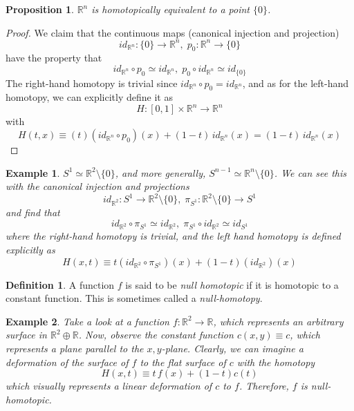\documentclass{article}
\newtheorem{proposition}[theorem]{Proposition}
\newtheorem{example}{Example}[section]
\theoremstyle{remark}
\theoremstyle{definition}
\newtheorem{definition}{Definition}[section]
\begin{document}
    \begin{proposition}
    $\mathbb{R}^n$ is homotopically equivalent to a point $\{0\}$.
    \end{proposition}
    \begin{proof}
    We claim that the continuous maps (canonical injection and projection)
    \[id_{\mathbb{R}^n}: \{0\} \longrightarrow \mathbb{R}^n , \; p_0 : \mathbb{R}^n \longrightarrow \{0\}\]
    have the property that 
    \[id_{\mathbb{R}^n} \circ p_0 \simeq id_{\mathbb{R}^n} , \; p_0 \circ id_{\mathbb{R}^n} \simeq id_{\{0\}}\]
    The right-hand homotopy is trivial since $id_{\mathbb{R}^n} \circ p_0 = id_{\mathbb{R}^n}$, and as for the left-hand homotopy, we can explicitly define it as
    \[H: [0,1] \times \mathbb{R}^n \longrightarrow \mathbb{R}^n\]
    with
    \[H(t, x) \equiv (t) (id_{\mathbb{R}^n} \circ p_0 )(x) + (1-t) \, id_{\mathbb{R}^n} (x) = (1-t)\, id_{\mathbb{R}^n} (x)\]
    \end{proof}

    \begin{example}
    $S^1 \simeq \mathbb{R}^2 \setminus \{0\}$, and more generally, $S^{n-1} \simeq \mathbb{R}^n \setminus \{0\}$. We can see this with the canonical injection and projections
    \[id_{\mathbb{R}^2}: S^1 \longrightarrow \mathbb{R}^2 \setminus \{0\}, \; \pi_{S^1}: \mathbb{R}^2 \setminus \{0\} \longrightarrow S^1\]
    and find that
    \[id_{\mathbb{R}^2} \circ \pi_{S^1} \simeq id_{\mathbb{R}^2}, \; \pi_{S^1} \circ id_{\mathbb{R}^2} \simeq id_{S^1}\]
    where the right-hand homotopy is trivial, and the left hand homotopy is defined explicitly as
    \[H(x, t) \equiv t (id_{\mathbb{R}^2} \circ \pi_{S^1})(x) + (1-t) (id_{\mathbb{R}^2})(x)\]
    \end{example}

    \begin{definition}
    A function $f$ is said to be \textit{null homotopic} if it is homotopic to a constant function. This is sometimes called a \textit{null-homotopy}. 
    \end{definition}

    \begin{example}
    Take a look at a function $f: \mathbb{R}^2 \longrightarrow \mathbb{R}$, which represents an arbitrary surface in $\mathbb{R}^2 \oplus \mathbb{R}$. Now, observe the constant function $c(x, y) \equiv c$, which represents a plane parallel to the $x, y$-plane. Clearly, we can imagine a deformation of the surface of $f$ to the flat surface of $c$ with the homotopy
    \[H(x, t) \equiv t \, f(x) + (1-t) c(t)\]
    which visually represents a linear deformation of $c$ to $f$. Therefore, $f$ is null-homotopic. 
    \end{example}
\end{document}
